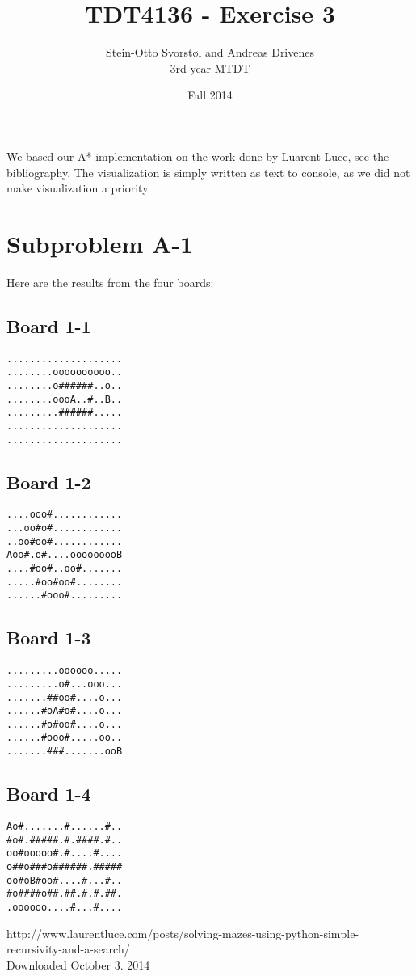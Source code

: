 \documentclass[11pt,a4paper]{article}
\author{Stein-Otto Svorstøl and Andreas Drivenes
\\3rd year MTDT}
\title{TDT4136 - Exercise 3}
\date{Fall 2014}
\begin{document}
\maketitle
We based our A*-implementation on the work done by Luarent Luce, see the bibliography. \cite{a-star-impl}
The visualization is simply written as text to console, as we did not make visualization a priority.

\section*{Subproblem A-1}
Here are the results from the four boards:
\subsection*{Board 1-1}
\begin{lstlisting}
....................
........oooooooooo..
........o######..o..
........oooA..#..B..
.........######.....
....................
....................
\end{lstlisting}
\subsection*{Board 1-2}
\begin{lstlisting}
....ooo#............
...oo#o#............
..oo#oo#............
Aoo#.o#....ooooooooB
....#oo#..oo#.......
.....#oo#oo#........
......#ooo#.........
\end{lstlisting}
\subsection*{Board 1-3}
\begin{lstlisting}
.........oooooo.....
.........o#...ooo...
.......##oo#....o...
......#oA#o#....o...
......#o#oo#....o...
......#ooo#.....oo..
.......###.......ooB
\end{lstlisting}
\subsection*{Board 1-4}
\begin{lstlisting}
Ao#.......#......#..
#o#.#####.#.####.#..
oo#ooooo#.#....#....
o##o###o######.#####
oo#oB#oo#....#...#..
#o####o##.##.#.#.##.
.oooooo....#...#....
\end{lstlisting}


\begin{thebibliography}{9}

  http://www.laurentluce.com/posts/solving-mazes-using-python-simple-recursivity-and-a-search/
  \\ Downloaded October 3. 2014

\end{thebibliography}
\end{document}
